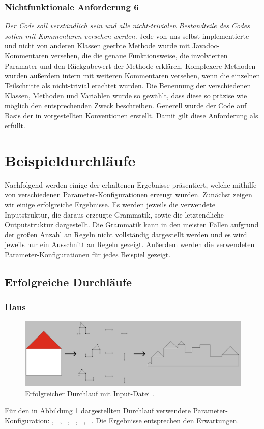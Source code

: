 \subsubsection{Nichtfunktionale Anforderung 6}
\textit{Der Code soll verständlich sein und alle nicht-trivialen Bestandteile des Codes sollen mit Kommentaren versehen werden.} Jede von uns selbst
implementierte und nicht von anderen Klassen geerbte Methode wurde mit Javadoc-Kommentaren versehen, die die genaue Funktionsweise, die involvierten
Paramater und den Rückgabewert der Methode erklären. Komplexere Methoden wurden außerdem intern mit weiteren Kommentaren versehen, wenn die einzelnen
Teilschritte als nicht-trivial erachtet wurden. Die Benennung der verschiedenen Klassen, Methoden und Variablen wurde so gewählt, dass diese so präzise
wie möglich den entsprechenden Zweck beschreiben. Generell wurde der Code auf Basis der in \cite{49_java_conventions} vorgestellten Konventionen erstellt.
Damit gilt diese Anforderung als erfüllt.

\section{Beispieldurchläufe}
Nachfolgend werden einige der erhaltenen Ergebnisse präsentiert, welche mithilfe von verschiedenen Parameter-Konfigurationen erzeugt wurden. Zunächst
zeigen wir einige erfolgreiche Ergebnisse. Es werden jeweils die verwendete Inputstruktur, die daraus erzeugte Grammatik, sowie die letztendliche Outputstruktur
dargestellt. Die Grammatik kann in den meisten Fällen aufgrund der großen Anzahl an Regeln nicht vollständig dargestellt werden und es wird jeweils nur ein
Ausschnitt an Regeln gezeigt. Außerdem werden die verwendeten Parameter-Konfigurationen für jedes Beispiel gezeigt.

\subsection{Erfolgreiche Durchläufe}

\subsubsection{Haus}
\begin{figure}[H]
    \centering
    \includegraphics[width=\textwidth]{images/house_success.png}
    \caption{Erfolgreicher Durchlauf mit Input-Datei .}
    \label{fig:house_success}
\end{figure}
Für den in Abbildung \ref{fig:house_success} dargestellten Durchlauf verwendete Parameter-Konfiguration: , \ , \ ,
\ , \ , \ . Die Ergebnisse entsprechen den Erwartungen.

